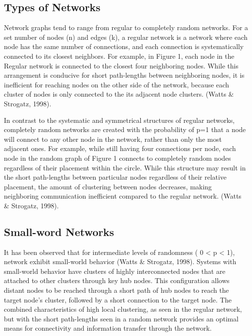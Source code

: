 \documentclass[11pt,letterpaper,doublespacing,titlepage]{article}
\begin{document}
\subsection{Types of Networks}
\par
Network graphs tend to range from regular to completely random networks. For a set number of nodes (n) and edges (k), a regular network is a network where each node has the same number of connections, and each connection is systematically connected to its closest neighbors. For example, in Figure 1, each node in the Regular network is connected to the closest four neighboring nodes. While this arrangement is conducive for short path-lengths between neighboring nodes, it is inefficient for reaching nodes on the other side of the network, because each cluster of nodes is only connected to the its adjacent node clusters. (Watts \& Strogatz, 1998).
\par
In contrast to the systematic and symmetrical structures of regular networks, completely random networks are created with the probability of p=1 that a node will connect to any other node in the network, rather than only the most adjacent ones. For example, while still having four connections per node, each node in the random graph of Figure 1 connects to completely random nodes regardless of their placement within the circle. While this structure may result in the short path-lengths between particular nodes regardless of their relative placement, the amount of clustering between nodes decreases, making neighboring communication inefficient compared to the regular network.  (Watts \& Strogatz, 1998).
\subsection{Small-word Networks}
\par
It has been observed that for intermediate levels of randomness ( 0 < p < 1),  network exhibit small-world behavior (Watts \& Strogatz, 1998). Systems with small-world behavior have clusters of highly interconnected nodes that are attached to other clusters through key hub nodes. This configuration allows distant nodes to be reached through a short path of hub nodes to reach the target node’s cluster, followed by a short connection to the target node. The combined characteristics of  high local clustering, as seen in the regular network, but with the short path-lengths seen in a random network provides an optimal means for connectivity and information transfer through the network. 
\end{document}
